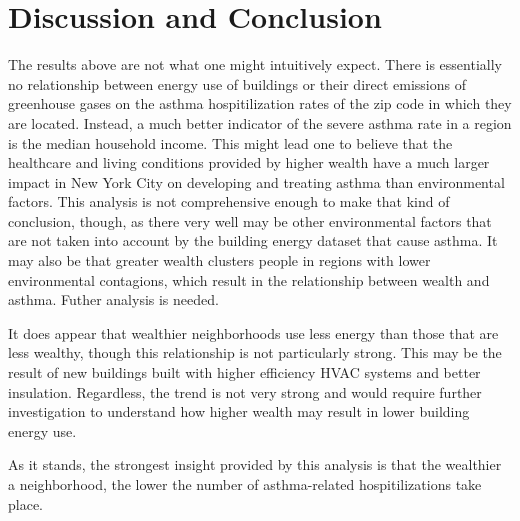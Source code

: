 \documentclass[conference]{IEEEtran}
\begin{document}
\section{Discussion and Conclusion}
The results above are not what one might intuitively expect. There is essentially
no relationship between energy use of buildings or their direct emissions of greenhouse
gases on the asthma hospitilization rates of the zip code in which they are located.
Instead, a much better indicator of the severe asthma rate in a region is the median
household income. This might lead one to believe that the healthcare and living conditions
provided by higher wealth have a much larger impact in New York City on developing
and treating asthma than environmental factors. This analysis is not comprehensive
enough to make that kind of conclusion, though, as there very well may be other environmental
factors that are not taken into account by the building energy dataset that cause
asthma. It may also be that greater wealth clusters people in regions with lower environmental
contagions, which result in the relationship between wealth and asthma. Futher analysis is
needed.

It does appear that wealthier neighborhoods use less energy than those that are less
wealthy, though this relationship is not particularly strong. This may be
the result of new buildings built with higher efficiency HVAC systems and better
insulation. Regardless, the trend is not very strong and would require further
investigation to understand how higher wealth may result in lower building energy use.

As it stands, the strongest insight provided by this analysis is that the wealthier
a neighborhood, the lower the number of asthma-related hospitilizations take place.

%
%
\end{document}
